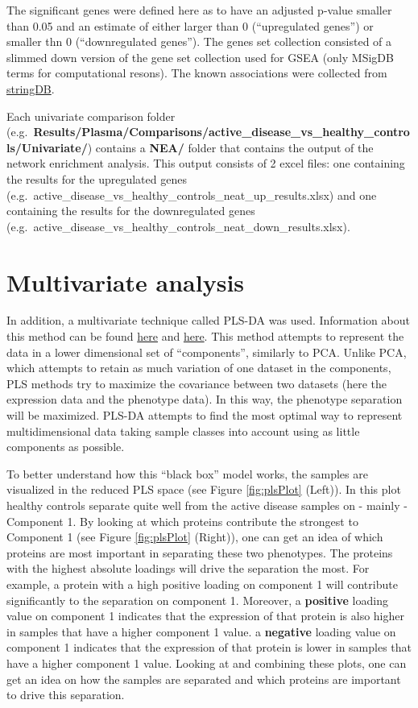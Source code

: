 \documentclass[
]{book}
\begin{document}
The significant genes were defined here as to have an adjusted p-value smaller than 0.05 and an estimate of either larger than 0 (``upregulated genes'') or smaller thn 0 (``downregulated genes''). The genes set collection consisted of a slimmed down version of the gene set collection used for GSEA (only MSigDB terms for computational resons). The known associations were collected from \href{https://string-db.org}{stringDB}.

Each univariate comparison folder (e.g.~\textbf{Results/Plasma/Comparisons/active\_disease\_vs\_healthy\_controls/Univariate/}) contains a \textbf{NEA/} folder that contains the output of the network enrichment analysis. This output consists of 2 excel files: one containing the results for the upregulated genes (e.g.~active\_disease\_vs\_healthy\_controls\_neat\_up\_results.xlsx) and one containing the results for the downregulated genes (e.g.~active\_disease\_vs\_healthy\_controls\_neat\_down\_results.xlsx).

\hypertarget{multivariate-analysis}{%
\section{Multivariate analysis}\label{multivariate-analysis}}

In addition, a multivariate technique called PLS-DA was used. Information about this method can be found \href{https://bmcbioinformatics.biomedcentral.com/articles/10.1186/1471-2105-12-253}{here} and \href{http://mixomics.org/case-studies/splsda-srbct/}{here}. This method attempts to represent the data in a lower dimensional set of ``components'', similarly to PCA. Unlike PCA, which attempts to retain as much variation of one dataset in the components, PLS methods try to maximize the covariance between two datasets (here the expression data and the phenotype data). In this way, the phenotype separation will be maximized. PLS-DA attempts to find the most optimal way to represent multidimensional data taking sample classes into account using as little components as possible.

To better understand how this ``black box'' model works, the samples are visualized in the reduced PLS space (see Figure \ref{fig:plsPlot} (Left)). In this plot healthy controls separate quite well from the active disease samples on - mainly - Component 1. By looking at which proteins contribute the strongest to Component 1 (see Figure \ref{fig:plsPlot} (Right)), one can get an idea of which proteins are most important in separating these two phenotypes. The proteins with the highest absolute loadings will drive the separation the most. For example, a protein with a high positive loading on component 1 will contribute significantly to the separation on component 1. Moreover, a \textbf{positive} loading value on component 1 indicates that the expression of that protein is also higher in samples that have a higher component 1 value. a \textbf{negative} loading value on component 1 indicates that the expression of that protein is lower in samples that have a higher component 1 value. Looking at and combining these plots, one can get an idea on how the samples are separated and which proteins are important to drive this separation.
\end{document}
